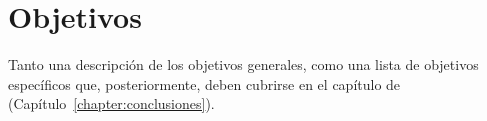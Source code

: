 \section{Objetivos}\label{section:objetivos}

Tanto una descripción de los objetivos generales, como una lista de objetivos específicos que, posteriormente, deben cubrirse en el capítulo de  (Capítulo~\ref{chapter:conclusiones}).